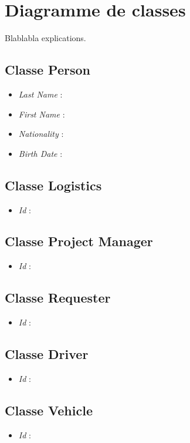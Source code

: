 \section{Diagramme de classes}

Blablabla explications.
\subsection{Classe Person}
\begin{itemize}
	\item \textit{Last Name} :
	\item \textit{First Name} :
	\item \textit{Nationality} :
	\item \textit{Birth Date} :
\end{itemize}

\subsection{Classe Logistics}
\begin{itemize}
	\item \textit{Id} :
\end{itemize}

\subsection{Classe Project Manager}
\begin{itemize}
	\item \textit{Id} :
\end{itemize}

\subsection{Classe Requester}
\begin{itemize}
	\item \textit{Id} :
\end{itemize}

\subsection{Classe Driver}
\begin{itemize}
	\item \textit{Id} :
\end{itemize}

\subsection{Classe Vehicle}
\begin{itemize}
	\item \textit{Id} :
\end{itemize}